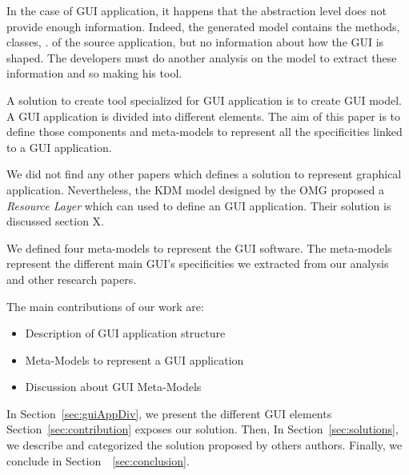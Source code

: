 \documentclass[conference]{IEEEtran}
\begin{document}
In the case of GUI application, it happens that the abstraction level does not provide enough information.
Indeed, the generated model contains the methods, classes, \etc. of the source application,
    but no information about how the GUI is shaped.
The developers must do another analysis on the model to extract these information and so
    making his tool.

A solution to create tool specialized for GUI application is to create GUI model.
A GUI application is divided into different elements.
The aim of this paper is to define those components and meta-models
    to represent all the specificities linked to a GUI application.

We did not find any other papers which defines a solution to represent graphical application.
Nevertheless, the KDM model designed by the OMG proposed a \textit{Resource Layer} which can used to define an GUI application.
Their solution is discussed section X.

We defined four meta-models to represent the GUI software.
The meta-models represent the different main GUI's specificities we extracted from our analysis
    and other research papers.

The main contributions of our work are: 

\begin{itemize}
    
    \item Description of GUI application structure

    \item Meta-Models to represent a GUI application

    \item Discussion about GUI Meta-Models

\end{itemize}

In Section~\ref{sec:guiAppDiv}, we present the different GUI elements
Section~\ref{sec:contribution} exposes our solution.
Then, In Section~\ref{sec:solutions}, we describe and categorized the solution proposed 
    by others authors.
Finally, we conclude in Section~~\ref{sec:conclusion}.
\end{document}
